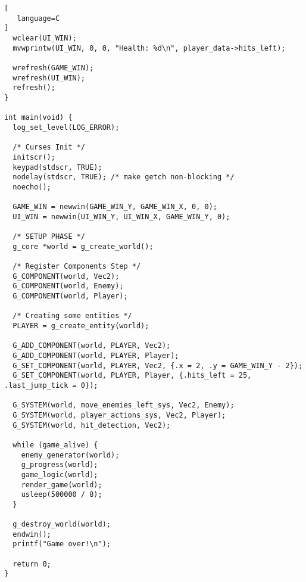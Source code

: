 \begin{lstlisting}[
   language=C
]
  wclear(UI_WIN);
  mvwprintw(UI_WIN, 0, 0, "Health: %d\n", player_data->hits_left);

  wrefresh(GAME_WIN);
  wrefresh(UI_WIN);
  refresh();
}

int main(void) {
  log_set_level(LOG_ERROR);

  /* Curses Init */
  initscr();
  keypad(stdscr, TRUE);
  nodelay(stdscr, TRUE); /* make getch non-blocking */
  noecho();

  GAME_WIN = newwin(GAME_WIN_Y, GAME_WIN_X, 0, 0);
  UI_WIN = newwin(UI_WIN_Y, UI_WIN_X, GAME_WIN_Y, 0);

  /* SETUP PHASE */
  g_core *world = g_create_world();

  /* Register Components Step */
  G_COMPONENT(world, Vec2);
  G_COMPONENT(world, Enemy);
  G_COMPONENT(world, Player);

  /* Creating some entities */
  PLAYER = g_create_entity(world);

  G_ADD_COMPONENT(world, PLAYER, Vec2);
  G_ADD_COMPONENT(world, PLAYER, Player);
  G_SET_COMPONENT(world, PLAYER, Vec2, {.x = 2, .y = GAME_WIN_Y - 2});
  G_SET_COMPONENT(world, PLAYER, Player, {.hits_left = 25, .last_jump_tick = 0});

  G_SYSTEM(world, move_enemies_left_sys, Vec2, Enemy);
  G_SYSTEM(world, player_actions_sys, Vec2, Player);
  G_SYSTEM(world, hit_detection, Vec2);

  while (game_alive) {
    enemy_generator(world);
    g_progress(world);
    game_logic(world);
    render_game(world);
    usleep(500000 / 8);
  }

  g_destroy_world(world);
  endwin();
  printf("Game over!\n");

  return 0;
}
\end{lstlisting}